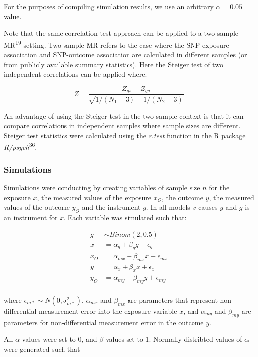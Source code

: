 \documentclass[]{article}
\begin{document}
For the purposes of compiling simulation results, we use an arbitrary
\(\alpha = 0.05\) value.

Note that the same correlation test approach can be applied to a
two-sample MR\textsuperscript{19} setting. Two-sample MR refers to the
case where the SNP-exposure association and SNP-outcome association are
calculated in different samples (or from publicly available summary
statistics). Here the Steiger test of two independent correlations can
be applied where.

\[
Z = \frac{Z_{gx} - Z_{gy}} { \sqrt{ 1 / (N_{1} - 3) + 1 / (N_{2} - 3) } }
\]

An advantage of using the Steiger test in the two sample context is that
it can compare correlations in independent samples where sample sizes
are different. Steiger test statistics were calculated using the
\emph{r.test} function in the R package
\emph{R/psych}\textsuperscript{36}.

\subsubsection{Simulations}\label{simulations}

Simulations were conducting by creating variables of sample size \(n\)
for the exposure \(x\), the measured values of the exposure \(x_O\), the
outcome \(y\), the measured values of the outcome \(y_O\) and the
instrument \(g\). In all models \(x\) causes \(y\) and \(g\) is an
instrument for \(x\). Each variable was simulated such that:

\[
\begin{aligned}
g & \sim Binom(2, 0.5) \\
x & = \alpha_g + \beta_g g + \epsilon_g \\
x_O & = \alpha_{mx} + \beta_{mx} x + \epsilon_{mx} \\
y & = \alpha_x + \beta_x x + \epsilon_x \\
y_O & = \alpha_{my} + \beta_{my} y + \epsilon_{my} \\
\end{aligned}
\]

where \(\epsilon_{m*} \sim N(0, \sigma^2_{m*})\), \(\alpha_{mx}\) and
\(\beta_{mx}\) are parameters that represent non-differential
measurement error into the exposure variable \(x\), and \(\alpha_{my}\)
and \(\beta_{my}\) are parameters for non-differential measurement error
in the outcome \(y\).

All \(\alpha\) values were set to 0, and \(\beta\) values set to 1.
Normally distribted values of \(\epsilon_*\) were generated such that
\end{document}
